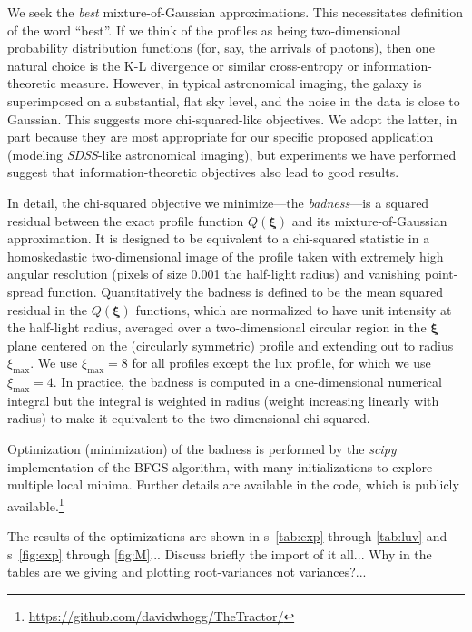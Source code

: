 \documentclass[12pt,pdftex,preprint]{aastex}
\newcommand{\project}[1]{\textsl{#1}}
\newcommand{\sdss}{\project{SDSS}}
\newcommand{\tvector}[1]{\boldsymbol{#1}}
\newcommand{\spos}{\tvector{\xi}}
\newcommand{\lux}{\mathrm{lux}}
\begin{document}
We seek the \emph{best} mixture-of-Gaussian approximations.  This
necessitates definition of the word ``best''.  If we think of the
profiles as being two-dimensional probability distribution functions
(for, say, the arrivals of photons), then one natural choice is the
K-L divergence or similar cross-entropy or information-theoretic
measure.  However, in typical astronomical imaging, the galaxy is
superimposed on a substantial, flat sky level, and the noise in the
data is close to Gaussian.  This suggests more chi-squared-like
objectives.  We adopt the latter, in part because they are most
appropriate for our specific proposed application (modeling \sdss-like
astronomical imaging), but experiments we have performed suggest that
information-theoretic objectives also lead to good results.

In detail, the chi-squared objective we minimize---the
\emph{badness}---is a squared residual between the exact profile
function $Q(\spos)$ and its mixture-of-Gaussian approximation.  It is
designed to be equivalent to a chi-squared statistic in a
homoskedastic two-dimensional image of the profile taken with
extremely high angular resolution (pixels of size 0.001 the half-light
radius) and vanishing point-spread function.  Quantitatively the
badness is defined to be the mean squared residual in the $Q(\spos)$
functions, which are normalized to have unit intensity at the
half-light radius, averaged over a two-dimensional circular region in
the $\spos$ plane centered on the (circularly symmetric) profile and
extending out to radius $\xi_{\max}$.  We use $\xi_{\max}=8$ for all
profiles except the $\lux$ profile, for which we use $\xi_{\max}=4$.
In practice, the badness is computed in a one-dimensional numerical
integral but the integral is weighted in radius (weight increasing
linearly with radius) to make it equivalent to the two-dimensional
chi-squared.

Optimization (minimization) of the badness is performed by the
\project{scipy} implementation of the BFGS algorithm, with many
initializations to explore multiple local minima.  Further details are
available in the code, which is publicly
available.\footnote{\url{https://github.com/davidwhogg/TheTractor/}}

The results of the optimizations are shown in \tablename
s~\ref{tab:exp} through \ref{tab:luv} and \figurename s~\ref{fig:exp}
through \ref{fig:M}... Discuss briefly the import of it all... Why in
the tables are we giving and plotting root-variances not variances?...
\end{document}
